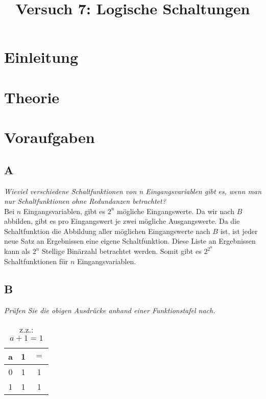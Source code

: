 

\title{Versuch 7: Logische Schaltungen}


\maketitle
\tableofcontents
\disclaimer

\def\NOT#1{\overline{#1}}
\def\AND{\cdot}
\def\OR{+}


\chapter{Einleitung}

\chapter{Theorie}

\chapter{Voraufgaben}

\section{A}
\textit{Wieviel verschiedene Schaltfunktionen von n Eingangsvariablen gibt es, wenn man nur Schaltfunktionen ohne Redundanzen betrachtet?}\\

Bei $n$ Eingangsvariablen, gibt es $2^n$ mögliche Eingangswerte. Da wir nach $B$ abbilden, gibt es pro Eingangswert je zwei mögliche Ausgangswerte. Da die Schaltfunktion die Abbildung aller möglichen Eingangswerte nach $B$ ist, ist jeder neue Satz an Ergebnissen eine eigene Schaltfunktion. Diese Liste an Ergebnissen kann als $2^n$ Stellige Binärzahl betrachtet werden. Somit gibt es $2^{2^n}$ Schaltfunktionen für $n$ Eingangsvariablen.


\section{B}
\textit{Prüfen Sie die obigen Ausdrücke anhand einer Funktionstafel nach.}\\


\begin{table}[H]
\centering
\begin{tabular}{cc|c}
a&1&$=$\\\hline
0&1&1\\
1&1&1\\
\end{tabular}
\caption{z.z.: $a \OR 1 = 1$}
\label{tab:truthsB1}
\end{table}

